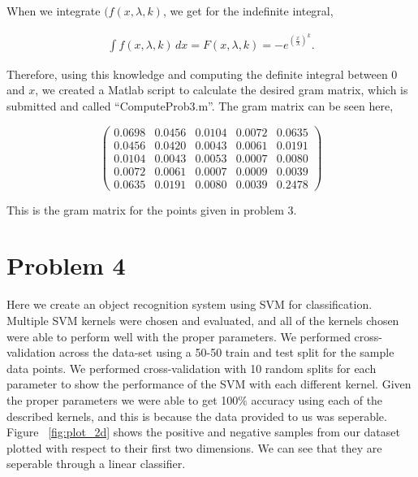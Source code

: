 \documentclass[paper=a4, fontsize=11pt]{scrartcl} %
\begin{document}
When we integrate $(f(x,\lambda,k)$, we get for the indefinite integral, 

\begin{align}
\int f(x,\lambda,k) \,dx = F(x,\lambda,k) = -e^{(\frac{x}{\lambda})^k}.
\end{align}

Therefore, using this knowledge and computing the definite integral between $0$ and $x$, we created a Matlab script to calculate the desired gram matrix, which is submitted and called ``ComputeProb3.m''.
The gram matrix can be seen here, 

\[ \left( \begin{array}{ccccc}
0.0698 & 0.0456 & 0.0104 & 0.0072 & 0.0635 \\
0.0456 & 0.0420 & 0.0043 & 0.0061 & 0.0191 \\
0.0104 & 0.0043 & 0.0053 & 0.0007 & 0.0080 \\
0.0072 & 0.0061 & 0.0007 & 0.0009 & 0.0039 \\
0.0635 & 0.0191 & 0.0080 & 0.0039 & 0.2478\end{array} \right)\] 

This is the gram matrix for the points given in problem 3.

\section{Problem 4}

Here we create an object recognition system using SVM for classification.
Multiple SVM kernels were chosen and evaluated, and all of the kernels chosen were able to perform well with the proper parameters.  
We performed cross-validation across the data-set using a 50-50 train and test split for the sample data points.
We performed cross-validation with 10 random splits for each parameter to show the performance of the SVM with each different kernel.
Given the proper parameters we were able to get 100\% accuracy using each of the described kernels, and this is because the data provided to us was seperable.  
Figure ~\ref{fig:plot_2d} shows the positive and negative samples from our dataset plotted with respect to their first two dimensions.
We can see that they are seperable through a linear classifier.
\end{document}
